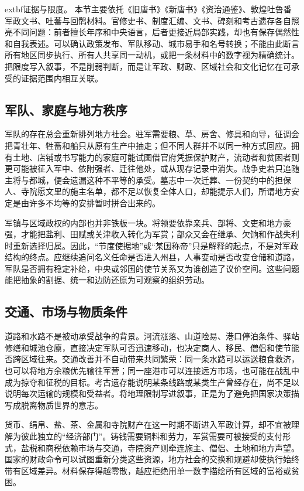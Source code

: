 \noindent	extbf{证据与限度。} 本节主要依托《旧唐书》《新唐书》《资治通鉴》、敦煌吐鲁番军政文书、吐蕃与回鹘材料。官修史书、制度汇编、文书、碑刻和考古遗存各自照亮不同问题：前者擅长年序和中央语言，后者更接近局部实践，却也有保存偶然性和自我表述。可以确认政策发布、军队移动、城市易手和名号转换；不能由此断言所有地区同步执行、所有人共享同一动机，或把一条材料中的数字视为精确统计。把限度写入叙事，不是削弱判断，而是让军政、财政、区域社会和文化记忆在可承受的证据范围内相互关联。

\subsection{军队、家庭与地方秩序}
军队的存在总会重新排列地方社会。驻军需要粮、草、房舍、修具和向导，征调会把青壮年、牲畜和船只从原有生产中抽走；但不同人群并不以同一种方式回应。拥有土地、店铺或书写能力的家庭可能试图借官府凭据保护财产，流动者和贫困者则更可能被征入军中、依附强者、迁往他处，或从现存记录中消失。战争史若只追随主将与都城，便会遗漏这种不平等的承受。墓志中一次迁葬、一份契约中的担保人、寺院愿文里的施主名单，都不足以恢复全体人口，却能提示人们，所谓地方安定是由许多不均等的安排暂时拼合出来的。

军镇与区域政权的内部也并非铁板一块。将领要依靠亲兵、部将、文吏和地方豪强，才能把盐利、田赋或关津收入转化为军赏；部众又会在继承、欠饷和作战失利时重新选择归属。因此，“节度使据地”或“某国称帝”只是解释的起点，不是对军政结构的终点。应继续追问名义任命是否进入州县，人事变动是否改变仓储和道路，军队是否拥有稳定补给，中央或邻国的使节关系又为谁创造了议价空间。这些问题能把抽象的割据、统一和边防还原为可观察的组织劳动。

\subsection{交通、市场与物质条件}
道路和水路不是被动承受战争的背景。河流涨落、山道险易、港口停泊条件、驿站修缮和城池仓廪，直接决定军队可否迅速移动，也决定商人、移民、僧侣和使节能否跨区域往来。交通改善并不自动带来共同繁荣：同一条水路可以运送粮食救济，也可以将地方余粮优先输往军营；同一座港市可以连接远方市场，也可能在战乱中成为掠夺和征税的目标。考古遗存能说明某条线路或某类生产曾经存在，尚不足以说明每次运输的规模和受益者。将地理限制写进叙事，正是为了避免把国家决策描写成脱离物质世界的意志。

货币、绢帛、盐、茶、金属和寺院财产在这一时期不断进入军政计算，却不宜被理解为彼此独立的“经济部门”。铸钱需要铜料和劳力，军赏需要可被接受的支付形式，盐税和商税依赖市场与交通，寺院资产则牵连施主、僧侣、土地和地方声望。国家的财政命令可以试图重新分类这些资源，地方社会的交换和规避却使执行始终带有区域差异。材料保存得越零散，越应拒绝用单一数字描绘所有区域的富裕或贫困。

